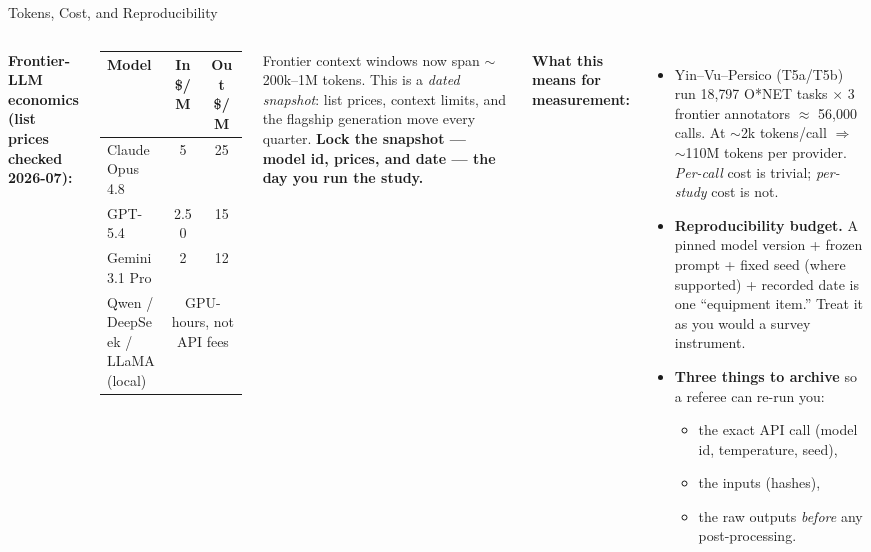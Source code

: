 \begin{frame}{Tokens, Cost, and Reproducibility}
\small
\begin{columns}[T]
\textbf{Frontier-LLM economics (list prices checked 2026-07):}
\medskip

\renewcommand{\arraystretch}{1.2}
\footnotesize
\begin{tabular}{|l|c|c|}
\hline
\textbf{Model} & \textbf{In \$/M} & \textbf{Out \$/M} \\
\hline
Claude Opus 4.8 & 5 & 25 \\
\hline
GPT-5.4 & 2.50 & 15 \\
\hline
Gemini 3.1 Pro & 2 & 12 \\
\hline
Qwen / DeepSeek / LLaMA (local) & \multicolumn{2}{c|}{GPU-hours, not API fees} \\
\hline
\end{tabular}

\smallskip
\scriptsize Frontier context windows now span $\sim$200k--1M tokens. This is a \emph{dated snapshot}: list prices, context limits, and the flagship generation move every quarter. \textbf{Lock the snapshot --- model id, prices, and date --- the day you run the study.}

\textbf{What this means for measurement:}
\footnotesize
\begin{itemize}
\item Yin--Vu--Persico (T5a/T5b) run 18{,}797 O*NET tasks $\times$ 3 frontier annotators $\approx$ 56{,}000 calls. At $\sim$2k tokens/call $\Rightarrow$ $\sim$110M tokens per provider. \emph{Per-call} cost is trivial; \emph{per-study} cost is not.

\medskip
\item \textbf{Reproducibility budget.} A pinned model version + frozen prompt + fixed seed (where supported) + recorded date is one ``equipment item.'' Treat it as you would a survey instrument.

\medskip
\item \textbf{Three things to archive} so a referee can re-run you:
\begin{itemize}\itemsep0pt
\item the exact API call (model id, temperature, seed),
\item the inputs (hashes),
\item the raw outputs \emph{before} any post-processing.
\end{itemize}
\end{itemize}
\end{columns}
\end{frame}

